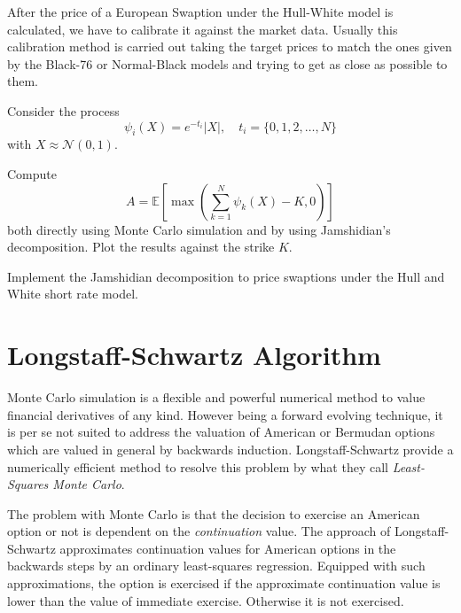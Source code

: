 \documentclass[12pt,a4paper]{article}
\begin{document}
After the price of a European Swaption under the Hull-White model is calculated, we have to calibrate it against the market data. Usually this calibration method is carried out taking the target prices to match the ones given by the Black-76 or Normal-Black models and trying to get as close as possible to them.

\begin{question}
Consider the process 
\begin{equation*}
\psi_i(X)=e^{-t_i}|X|,\quad t_i=\{0,1,2,\ldots, N\}
\end{equation*}
with $X\approx\mathcal{N}(0,1)$.

Compute 
\begin{equation*}
A = \mathbb{E}\left[\max\left(\sum_{k=1}^N \psi_k(X) - K, 0\right)\right]
\end{equation*}
both directly using Monte Carlo simulation and by using Jamshidian's decomposition.
Plot the results against the strike $K$.
\end{question}

\begin{question}
Implement the Jamshidian decomposition to price swaptions under the Hull and White short rate model.
\end{question}

\clearpage
\section{Longstaff-Schwartz Algorithm}

Monte Carlo simulation is a flexible and powerful numerical method to value financial derivatives of any kind. However being a forward evolving technique, it is per se not suited to address the valuation of American or Bermudan options which are valued in general by backwards induction. Longstaff-Schwartz provide a numerically efficient method to resolve this problem by what they call \emph{Least-Squares Monte Carlo}.

The problem with Monte Carlo is that the decision to exercise an American option or not is dependent on the \emph{continuation} value. %
The approach of Longstaff-Schwartz approximates continuation values for American options in the backwards steps by an ordinary least-squares regression.
Equipped with such approximations, the option is exercised if the approximate continuation value is lower than the value of immediate exercise. Otherwise it is not exercised.
\end{document}

